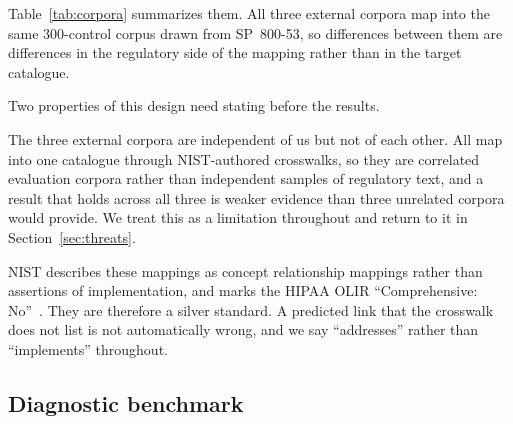 \documentclass[smallextended,natbib]{svjour3}
\begin{document}
Table~\ref{tab:corpora} summarizes them. All three external corpora map into the same 300-control corpus drawn from SP~800-53, so differences between them are differences in the regulatory side of the mapping rather than in the target catalogue.

\begin{table}[htbp]
\caption{The four evaluation corpora. Recall@20 is the share of requirements for which the dual-encoder places a gold control in its top 20, and bounds any method that reranks that shortlist.}
\label{tab:corpora}
\centering
\setlength{\tabcolsep}{3pt}
\small
{}
\end{table}

Two properties of this design need stating before the results.

The three external corpora are independent of us but not of each other. All map into one catalogue through NIST-authored crosswalks, so they are correlated evaluation corpora rather than independent samples of regulatory text, and a result that holds across all three is weaker evidence than three unrelated corpora would provide. We treat this as a limitation throughout and return to it in Section~\ref{sec:threats}.

NIST describes these mappings as concept relationship mappings rather than assertions of implementation, and marks the HIPAA OLIR ``Comprehensive: No''~\citep{NISTIR8477}. They are therefore a silver standard. A predicted link that the crosswalk does not list is not automatically wrong, and we say ``addresses'' rather than ``implements'' throughout.

\subsection{Diagnostic benchmark}
\label{sec:dataset-synth}
\end{document}
